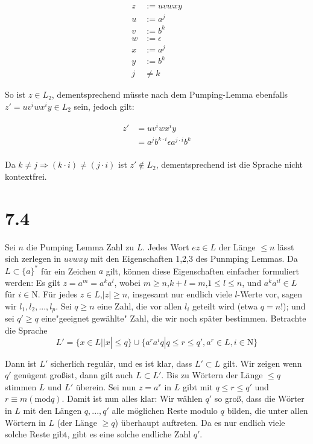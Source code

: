\documentclass[12pt, a4paper]{article}
\begin{document}
\begin{align*}
z &:= uvwxy \\
u &:= a^j \\
v &:= b^k \\
w &:= \epsilon \\
x &:= a^j \\
y &:= b^k \\
j &\neq k 
\end{align*}

So ist $z \in L_2$, dementsprechend müsste nach dem Pumping-Lemma ebenfalls $z' = u v^i w x^i y \in L_2$ sein, jedoch gilt:

\begin{align*}
z' &= u v^i w x^i y \\
&= a^j b^{k \cdot i} \epsilon a^{j \cdot i} b^k \\
\end{align*}

Da  $k \neq j \Rightarrow (k \cdot i) \neq (j \cdot i)$ ist $z' \notin L_2$, dementsprechend ist die Sprache nicht kontextfrei.

\section*{7.4}
Sei $n$ die Pumping Lemma Zahl zu $L$. Jedes Wort $ez \in L$ der L\"ange $\leq n$ l\"asst sich zerlegen in $uvwxy$ mit den Eigenschaften 1,2,3 des Punmping Lemmas. Da $L \subset \{a\}^*$ f\"ur ein Zeichen $a$ gilt, k\"onnen diese Eigenschaften einfacher formuliert werden:
Es gilt $z= a^m = a^ka^l$, wobei $m \geq n$,$k+l = m$,$ 1 \leq l \leq n$, und $a^ka^{il} \in L$ f\"ur $i \in \mathrm{N}$. F\"ur jedes $z \in L$,$|z| \geq n$, insgesamt nur endlich viele $l$-Werte vor, sagen wir $l_1,l_2,...,l_p$. Sei $q \geq n$ eine Zahl, die vor allen $l_i$ geteilt wird (etwa $q = n!$); und sei $q' \geq q$ eine"geeignet gew\"ahlte" Zahl, die wir noch sp\"ater bestimmen. Betrachte die Sprache
\begin{equation*}
L' = \{ x \in L| |x| \le q\} \cup \{a^ra^iq | q \leq r\leq q' , a^r \in L, i \in \mathrm{N} \}
\end{equation*}

Dann ist $L'$ sicherlich regul\"ar, und es ist klar, dass $L' \subset L$ gilt. Wir zeigen wenn $q'$ gen\"ugent gro\ss ist, dann gilt auch $L \subset L'$. Bis zu W\"ortern der L\"ange $\le q$ stimmen $L$ und $L'$ \"uberein. Sei nun $z = a^r$ in $L$ gibt mit $q \leq r \leq q'$ und $r \equiv m (\text{mod}q)$. Damit ist nun alles klar: Wir w\"ahlen $q'$ so gro\ss, dass die W\"orter in $L$ mit den L\"angen $q,...,q'$ alle m\"oglichen Reste modulo $q$ bilden, die unter allen W\"ortern in $L$ (der L\"ange $\geq q$) \"uberhaupt auftreten. Da es nur endlich viele solche Reste gibt, gibt es eine solche endliche Zahl $q'$.  
 
\end{document}

